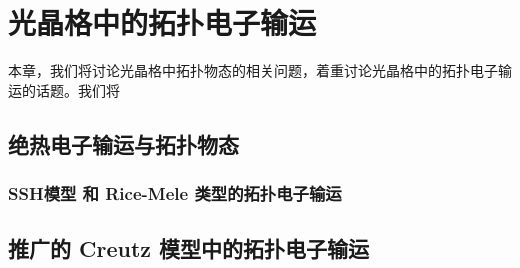 \chapter{光晶格中的拓扑电子输运}

本章，我们将讨论光晶格中拓扑物态的相关问题，着重讨论光晶格中的拓扑电子输运的话题。我们将



\section{绝热电子输运与拓扑物态}\label{sec:topocp}




\subsection{SSH模型 和 Rice-Mele 类型的拓扑电子输运}\label{sec:ssh}




\section{推广的 Creutz 模型中的拓扑电子输运}\label{sec:creutz}